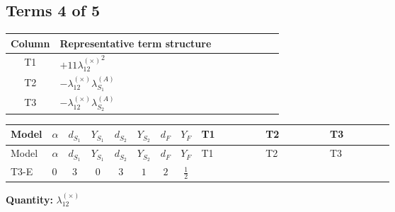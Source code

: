 \documentclass[8pt]{article}
\begin{document}
\begin{landscape}
\subsection*{Terms 4 of 5}
\begin{center}
\begin{tabular}{@{}c >{\raggedright\arraybackslash}p{0.82\linewidth}@{}}
\toprule
Column & Representative term structure \\
\midrule
T1 & \(\displaystyle +11 {\lambda_{12}^{(\times)}}^2\) \\
\midrule
T2 & \(\displaystyle -{\lambda_{12}^{(\times)}} {\lambda_{S_1}^{(A)}}\) \\
\midrule
T3 & \(\displaystyle -{\lambda_{12}^{(\times)}} {\lambda_{S_2}^{(A)}}\) \\
\midrule
\bottomrule
\end{tabular}
\end{center}
\smallskip
\tiny
\begin{longtable}{@{}llcccccc >{\raggedright\arraybackslash}p{0.21\linewidth} >{\raggedright\arraybackslash}p{0.21\linewidth} >{\raggedright\arraybackslash}p{0.21\linewidth}@{}}
\toprule
Model & $\alpha$ & $d_{S_1}$ & $Y_{S_1}$ & $d_{S_2}$ & $Y_{S_2}$ & $d_F$ & $Y_F$ & T1 & T2 & T3 \\
\midrule
\endfirsthead
\toprule
Model & $\alpha$ & $d_{S_1}$ & $Y_{S_1}$ & $d_{S_2}$ & $Y_{S_2}$ & $d_F$ & $Y_F$ & T1 & T2 & T3 \\
\midrule
\endhead
T3-E & $0$ & $3$ & $0$ & $3$ & $1$ & $2$ & $\frac{1}{2}$ & \scriptsize\adjustbox{max width=\linewidth}{$\begin{gathered} +11 {\lambda_{12}^{(\times)}}^2\end{gathered}$} & \scriptsize\adjustbox{max width=\linewidth}{$\begin{gathered} -{\lambda_{12}^{(\times)}} {\lambda_{S_1}^{(A)}}\end{gathered}$} & \scriptsize\adjustbox{max width=\linewidth}{$\begin{gathered} -{\lambda_{12}^{(\times)}} {\lambda_{S_2}^{(A)}}\end{gathered}$} \\
\midrule
\bottomrule
\end{longtable}
\clearpage
\noindent\textbf{Quantity: }$\lambda_{12}^{(\times)}$\par\smallskip

\end{landscape}
\end{document}
